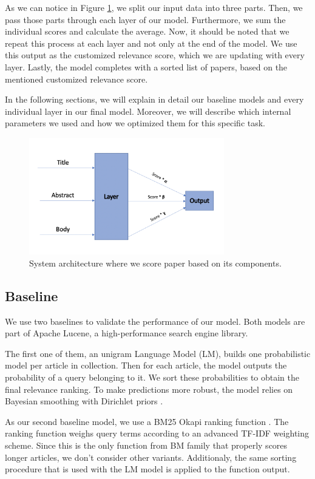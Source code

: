 \documentclass[10pt, a4paper]{article}
\begin{document}
	As we can notice in Figure \ref{figure:approach}, we split our input data into three parts. Then, we pass those parts through each layer of our model. Furthermore, we sum the individual scores and calculate the average. Now, it should be noted that we repeat this process at each layer and not only at the end of the model. We use this output as the customized relevance score, which we are updating with every layer.  Lastly, the model completes with a sorted list of papers, based on the mentioned customized relevance score.
	
	In the following sections, we will explain in detail our baseline models and every individual layer in our final model. Moreover, we will describe which internal parameters we used and how we optimized them for this specific task.
	
	\begin{figure}[h]
		\centering
		\includegraphics[width=8.5cm]{approach}
		\caption{System architecture where we score paper based on its components.  }
		\label{figure:approach}
	\end{figure}
	
	
	\subsection{Baseline}
	
	We use two baselines to validate the performance of our model. Both models are part of Apache Lucene, a high-performance search engine library.
	
	The first one of them, an unigram Language Model (LM), builds one probabilistic model per article in collection. Then for each article, the model outputs the probability of a query belonging to it. We sort these probabilities to obtain the final relevance ranking. To make predictions more robust, the model relies on Bayesian smoothing with Dirichlet priors \citep{zhai2004study}.
	
	As our second baseline model, we use a BM25 Okapi ranking function \citep{robertson1995okapi}. The ranking function weighs query terms according to an advanced TF-IDF weighting scheme. Since this is the only function from BM family that properly scores longer articles, we don't consider other variants. Additionaly, the same sorting procedure that is used with the LM model is applied to the function output.
	
\end{document}
